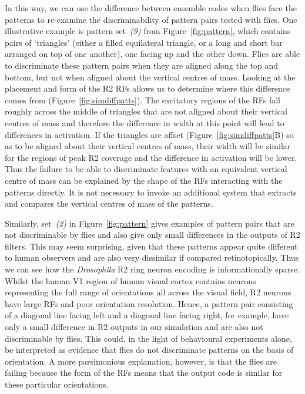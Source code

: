 In this way, we can use the difference between ensemble codes when flies face the patterns to re-examine the discriminability of pattern pairs tested with flies. One illustrative example is pattern set~\emph{(9)} from Figure~\ref{fig:pattern}, which contains pairs of ‘triangles’ (either a filled equilateral triangle, or a long and short bar arranged on top of one another), one facing up and the other down. Flies are able to discriminate these pattern pairs when they are aligned along the top and bottom, but not when aligned about the vertical centres of mass\cite{Ernst1999}. Looking at the placement and form of the R2 \acp{RF} allows us to determine where this difference comes from (Figure~\ref{fig:simdiffpatts}). The excitatory regions of the \acp{RF} fall roughly across the middle of triangles that are not aligned about their vertical centres of mass and therefore the difference in width at this point will lead to differences in activation. If the triangles are offset (Figure~\ref{fig:simdiffpatts}B) so as to be aligned about their vertical centres of mass, their width will be similar for the regions of peak R2 coverage and the difference in activation will be lower. Thus the failure to be able to discriminate features with an equivalent vertical centre of mass can be explained by the shape of the \acp{RF} interacting with the patterns directly. It is not necessary to invoke an additional system that extracts and compares the vertical centres of mass of the patterns.

Similarly, set~\emph{(2)} in Figure~\ref{fig:pattern} gives examples of pattern pairs that are not discriminable by flies and also give only small differences in the outputs of R2 filters. This may seem surprising, given that these patterns appear quite different to human observers and are also very dissimilar if compared retinotopically. Thus we can see how the \emph{Drosophila} R2 ring neuron encoding is informationally sparse. Whilst the human V1 region of human visual cortex contains neurons representing the full range of orientations all across the visual field, R2 neurons have large \acp{RF} and poor orientation resolution. Hence, a pattern pair consisting of a diagonal line facing left and a diagonal line facing right, for example, have only a small difference in R2 outputs in our simulation and are also not discriminable by flies. This could, in the light of behavioural experiments alone, be interpreted as evidence that flies do not discriminate patterns on the basis of orientation. A more parsimonious explanation, however, is that the flies are failing because the form of the \acp{RF} means that the output code is similar for these particular orientations.


